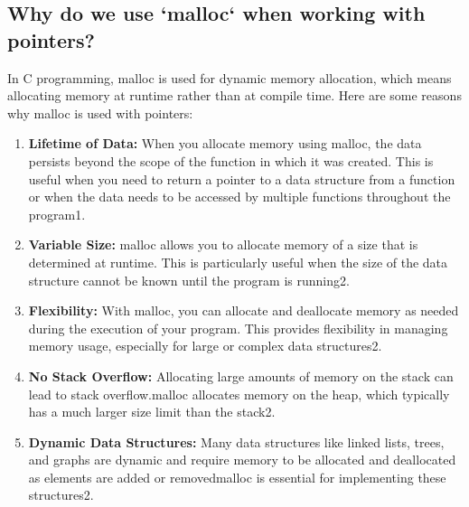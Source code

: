 \subsection{Why do we use `malloc` when working with pointers?}
In C programming, malloc is used for dynamic memory allocation, which means allocating memory at runtime rather than at compile time. Here are some reasons why malloc is used with pointers:
\begin{enumerate}
    \item \textbf{Lifetime of Data:} When you allocate memory using malloc, the data persists beyond the scope of the function in which it was created. This is useful when you need to return a pointer to a data structure from a function or when the data needs to be accessed by multiple functions throughout the program1.
    \item \textbf{Variable Size:} malloc allows you to allocate memory of a size that is determined at runtime. This is particularly useful when the size of the data structure cannot be known until the program is running2.
    \item \textbf{Flexibility:} With malloc, you can allocate and deallocate memory as needed during the execution of your program. This provides flexibility in managing memory usage, especially for large or complex data structures2.
    \item \textbf{No Stack Overflow:} Allocating large amounts of memory on the stack can lead to stack overflow.malloc allocates memory on the heap, which typically has a much larger size limit than the stack2.
    \item \textbf{Dynamic Data Structures:} Many data structures like linked lists, trees, and graphs are dynamic and require memory to be allocated and deallocated as elements are added or removedmalloc is essential for implementing these structures2.
\end{enumerate}